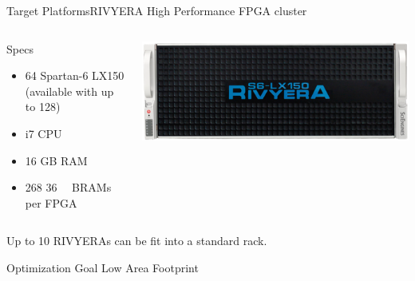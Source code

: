 \begin{frame}{Target Platforms}{RIVYERA}
    High Performance FPGA cluster
    \begin{columns}[T]
      \begin{column}{.5\textwidth}
        \begin{block}{Specs}
          \begin{itemize}
            \item 64 Spartan-6 LX150\\(available with up to 128)
            \item i7 CPU
            \item 16 GB RAM
            \item 268 \SI{36}{\kilo\bit} BRAMs per FPGA
          \end{itemize}
        \end{block}
      \end{column}
      \begin{column}{.45\textwidth}
        \vspace{10mm}
        \includegraphics[width=\textwidth]{data/rivyera.png}
      \end{column}
    \end{columns}
    \vspace{5mm}
    Up to 10 RIVYERAs can be fit into a standard rack.
\end{frame}

\begin{frame}{Optimization Goal}
    \center \Huge
    Low Area Footprint
\end{frame}

